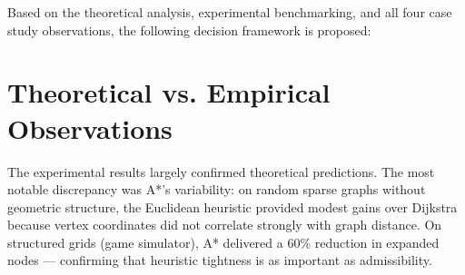 \documentclass[12pt, a4paper, oneside]{report}
\theoremstyle{definition}
\begin{document}
Based on the theoretical analysis, experimental benchmarking, and all four case study observations, the following decision framework is proposed:

\begin{table}[H]
\centering
\caption{Unified Algorithm Selection Framework}
\label{tab:selection}
\end{table}

\section{Theoretical vs. Empirical Observations}

The experimental results largely confirmed theoretical predictions. The most notable discrepancy was A*'s variability: on random sparse graphs without geometric structure, the Euclidean heuristic provided modest gains over Dijkstra because vertex coordinates did not correlate strongly with graph distance. On structured grids (game simulator), A* delivered a 60\% reduction in expanded nodes — confirming that heuristic tightness is as important as admissibility.
\end{document}
